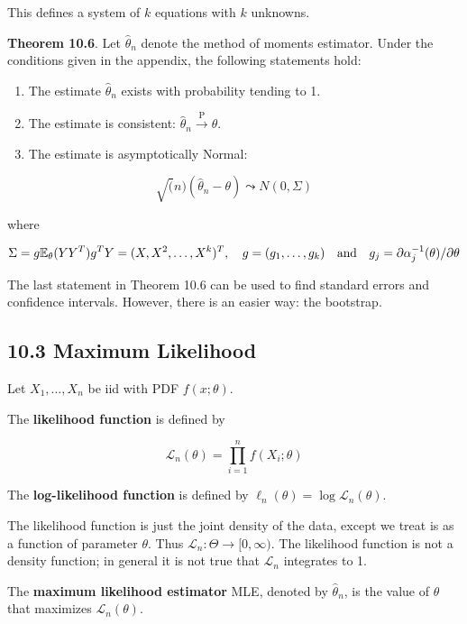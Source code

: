 This defines a system of \(k\) equations with \(k\) unknowns.

\textbf{Theorem 10.6}. Let \(\hat{\theta}_{n}\) denote the method of
moments estimator. Under the conditions given in the appendix, the
following statements hold:

\begin{enumerate}
\def\labelenumi{(\arabic{enumi})}
\item
  The estimate \(\hat{\theta}_{n}\) exists with probability tending to 1.
\item
  The estimate is consistent:
  \(\hat{\theta}_{n} \xrightarrow{\text{P}} \theta\).
\item
  The estimate is asymptotically Normal:
\end{enumerate}

\[\sqrt(n)(\hat{\theta}_{n} - \theta) \leadsto N(0, \Sigma) \]

where

\[
\Sigma = g \mathbb{E}_\theta (Y Y^T) g^T \\
Y = (X, X^{2}, \dots, X^{k})^T, \quad g = (g_{1}, \dots, g_{k}) \quad \text{and} \quad g_{j} = \partial \alpha_{j}^{-1}(\theta)/\partial\theta
\]

The last statement in Theorem 10.6 can be used to find standard errors
and confidence intervals. However, there is an easier way: the
bootstrap.

\subsection*{10.3 Maximum Likelihood}\label{maximum-likelihood}

Let \(X_{1}, \dots, X_{n}\) be iid with PDF \(f(x; \theta)\).

The \textbf{likelihood function} is defined by

\[ \mathcal{L}_{n}(\theta) = \prod_{i=1}^{n} f(X_{i}; \theta) \]

The \textbf{log-likelihood function} is defined by
\(\ell_{n}(\theta) = \log \mathcal{L}_{n}(\theta)\).

The likelihood function is just the joint density of the data, except we
treat is as a function of parameter \(\theta\). Thus
\(\mathcal{L}_{n} : \Theta \rightarrow [0, \infty)\). The likelihood
function is not a density function; in general it is not true that
\(\mathcal{L}_{n}\) integrates to 1.

The \textbf{maximum likelihood estimator} MLE, denoted by
\(\hat{\theta}_{n}\), is the value of \(\theta\) that maximizes
\(\mathcal{L}_{n}(\theta)\).

